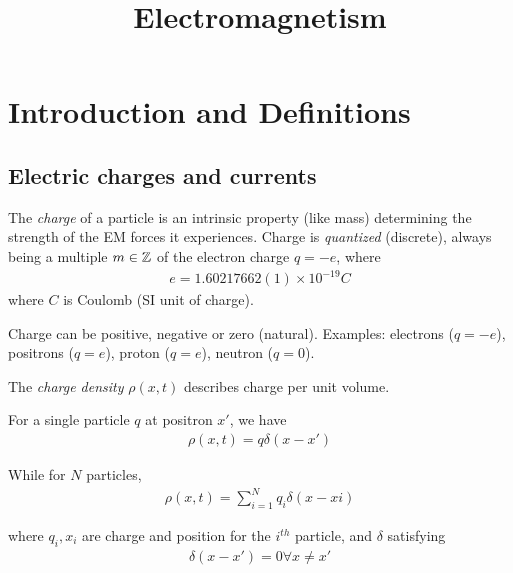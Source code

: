 \documentclass[a4paper]{article}
\begin{document}
\title{Electromagnetism}

\maketitle

\newpage

\tableofcontents

\newpage

\section{Introduction and Definitions}

\subsection{Electric charges and currents}

The \emph{charge} of a particle is an intrinsic property (like mass) determining the strength of the EM forces it experiences. Charge is \emph{quantized} (discrete), always being a multiple $m \in \mathbb{Z}$ of the electron charge $q=-e$, where
\begin{equation*}
\begin{aligned}
e= 1.60217662(1) \times 10^{-19} C
\end{aligned}
\end{equation*}
where $C$ is Coulomb (SI unit of charge).

Charge can be positive, negative or zero (natural). Examples: electrons ($q=-e$), positrons ($q=e$), proton ($q=e$), neutron ($q=0$).

The \emph{charge density} $\rho(x,t)$ describes charge per unit volume.

For a single particle $q$ at positron $x'$, we have
\begin{equation}\tag{1.1} \label{eq:1.1}
\begin{aligned}
\rho(x,t) = q \delta(x-x') 
\end{aligned}
\end{equation}

While for $N$ particles,
\begin{equation*}\tag{1.2} \label{eq:1.2}
\begin{aligned}
\rho(x,t) =\sum_{i=1}^N q_i \delta(x-xi)
\end{aligned}
\end{equation*}

where $q_i,x_i$ are charge and position for the $i^{th}$ particle, and $\delta$ satisfying
\begin{equation*}\tag{1.3} \label{eq:1.3}
\begin{aligned}
\delta(x-x')=0 \forall x \neq x'
\end{aligned}
\end{equation*}
\end{document}
